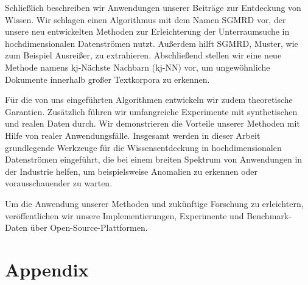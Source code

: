 \documentclass[smalldiss]{sdqdiss-a4}
\begin{document}
Schließlich beschreiben wir Anwendungen unserer Beiträge zur Entdeckung von Wissen. Wir schlagen einen Algorithmus mit dem Namen \gls{SGMRD} vor, der unsere neu entwickelten Methoden zur Erleichterung der Unterraumsuche in hochdimensionalen Datenströmen nutzt. Außerdem hilft \gls{SGMRD}, Muster, wie zum Beispiel Ausreißer, zu extrahieren. Abschließend stellen wir eine neue Methode namens kj-Nächste Nachbarn (\gls{kj-NN}) vor, um ungewöhnliche Dokumente innerhalb großer Textkorpora zu erkennen.

Für die von uns eingeführten Algorithmen entwickeln wir zudem theoretische Garantien. Zusätzlich führen wir umfangreiche Experimente mit synthetischen und realen Daten durch. Wir demonstrieren die Vorteile unserer Methoden mit Hilfe von realer Anwendungsfälle. Insgesamt werden in dieser Arbeit grundlegende Werkzeuge für die Wissensentdeckung in hochdimensionalen Datenströmen eingeführt, die bei einem breiten Spektrum von Anwendungen in der Industrie helfen, um beispielsweise Anomalien zu erkennen oder vorausschauender zu warten.

Um die Anwendung unserer Methoden und zukünftige Forschung zu erleichtern, veröffentlichen wir unsere Implementierungen, Experimente und Benchmark-Daten über Open-Source-Plattformen.


\cleardoublepage
\renewcommand{\contentsname}{Table of Contents}
{
	\hypersetup{linkcolor=black}
	\tableofcontents
}

\mainmatter











\appendix

\cleardoublepage
{}
{}
\part*{Appendix}
\end{document}
